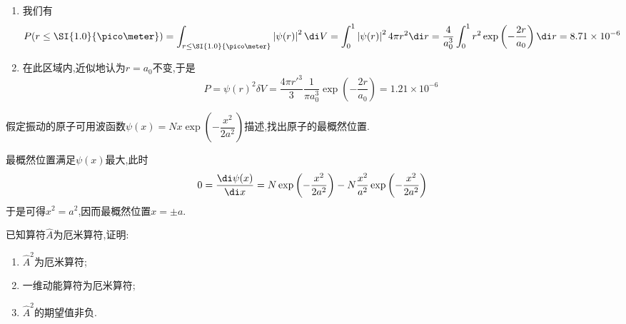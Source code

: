 \documentclass{ctexart}
\begin{document}
\begin{solution}
\begin{enumerate}[label=(\alph*)]
    \item 我们有
    \[P(r\leq\SI{1.0}{\pico\meter})=\int_{r\leq\SI{1.0}{\pico\meter}}\left|\psi(r)\right|^2\di V=\int_0^1\left|\psi(r)\right|^24\pi r^2\di r=\dfrac{4}{a_0^3}\int_0^1r^2\exp\left(-\dfrac{2r}{a_0}\right)\di r=8.71\times10^{-6}\]
    \item 在此区域内,近似地认为$r=a_0$不变,于是
    \[P=\psi(r)^2\delta V=\dfrac{4\pi r'^3}{3}\dfrac{1}{\pi a_0^3}\exp\left(-\dfrac{2r}{a_0}\right)=1.21\times10^{-6}\]
\end{enumerate}
\end{solution}
\begin{homework}[9.]
    假定振动的原子可用波函数$\psi(x)=Nx\exp\left(-\dfrac{x^2}{2a^2}\right)$描述,找出原子的最概然位置.
\end{homework}
\begin{solution}
    最概然位置满足$\psi(x)$最大,此时
    \[0=\dfrac{\di\psi(x)}{\di x}=N\exp\left(-\dfrac{x^2}{2a^2}\right)-N\dfrac{x^2}{a^2}\exp\left(-\dfrac{x^2}{2a^2}\right)\]
    于是可得$x^2=a^2$,因而最概然位置$x=\pm a$.
\end{solution}
\begin{homework}[10.]
    已知算符$\hat{A}$为厄米算符,证明:
    \begin{enumerate}[label=(\alph*)]
        \item $\hat{A}^2$为厄米算符;
        \item 一维动能算符为厄米算符;
        \item $\hat{A}^2$的期望值非负.
    \end{enumerate}
\end{homework}
\end{document}
